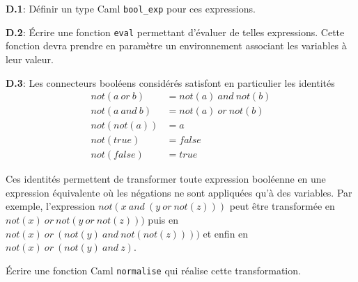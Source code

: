 \documentclass[11pt, a4paper]{article}
\begin{document}
\noindent
\textbf{D.1}: Définir un type Caml \texttt{bool\_exp} pour ces
expressions.

\noindent
\textbf{D.2}: Écrire une fonction \texttt{eval} permettant d'évaluer
de telles expressions. Cette fonction devra prendre en paramètre un
environnement associant les variables à leur valeur.

\noindent
\textbf{D.3}:
Les connecteurs booléens considérés satisfont en particulier
les identités
\begin{align*}
not(a ~or~ b)  & = not(a) ~and~ not(b)\\
not(a~ and~ b) & = not(a)~ or~ not(b)\\
not(not(a))    & = a\\
not(true)      & = false\\
not(false)     & = true
\end{align*}

\noindent
Ces identités permettent de transformer toute expression booléenne
en une expression équivalente où les négations ne sont
appliquées qu'à des variables. Par exemple, l'expression $not(x
~and~ (y~ or~ not(z)))$ peut être transformée en $not(x) ~or~
not(y ~or ~not(z)))$ puis en $not(x) ~or~ (not(y)~ and ~not(not(z))))$
et enfin en $not(x) ~or~ (not(y) ~and~ z)$.

\noindent
Écrire une fonction Caml \texttt{normalise} qui réalise cette
transformation.
\end{document}
